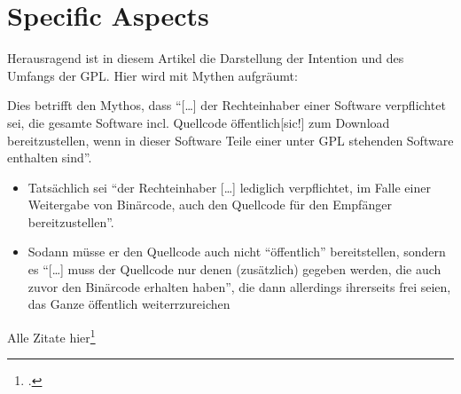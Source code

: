 \documentclass[DIV=calc,BCOR=5mm,11pt,headings=small,oneside,abstract=true, toc=bib]{scrartcl}
\begin{document}
\section{Specific Aspects}

Herausragend ist in diesem Artikel die Darstellung der Intention und des Umfangs
der GPL. Hier wird mit Mythen aufgräumt:

Dies betrifft den Mythos, dass \enquote{[\ldots] der Rechteinhaber einer
Software verpflichtet sei, die gesamte Software incl. Quellcode
öffentlich[sic!] zum Download bereitzustellen, wenn in dieser Software
Teile einer unter GPL stehenden Software enthalten sind}.

\begin{itemize}
  \item Tatsächlich sei \enquote{der Rechteinhaber [\ldots] lediglich
  verpflichtet, im Falle einer Weitergabe von Binärcode, auch den
  Quellcode für den Empfänger bereitzustellen}.
  \item Sodann müsse er den Quellcode auch nicht \enquote{öffentlich}
  bereitstellen, sondern es \enquote{[\ldots] muss der Quellcode nur denen
  (zusätzlich) gegeben werden, die auch zuvor den Binärcode erhalten
  haben}, die dann allerdings ihrerseits frei seien, das Ganze öffentlich
  weiterrzureichen
\end{itemize}

Alle Zitate hier\footcite[vgl.][181]{BreGlaGra2008a}


\small

\end{document}
